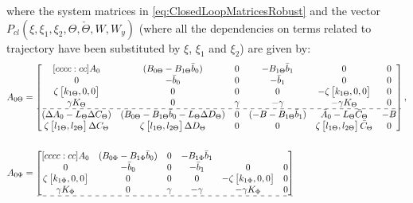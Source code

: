 \documentclass[../main.tex]{subfiles}
\begin{document}
where the system matrices in \eqref{eq:ClosedLoopMatricesRobust} and the vector $P_{cl}(\xi,\xi_1,\xi_2, \Theta,\check{\Theta},W,W_y)$ (where all the dependencies on terms related to trajectory have been substituted by $\xi$, $\xi_1$ and $\xi_2$) are given by:
\begingroup
\renewcommand*{\arraystretch}{1.5}
\begin{align*}
A_{0\Theta} &= 
\begin{bmatrix}[cccc:cc]
A_0 & (B_{0\Theta} - B_{1\Theta} \bar{b}_0) & 0 & -B_{1\Theta}\bar{b} _1 & 0 & 0\\
%
0 & -\bar{b}_0 & 0 & -\bar{b}_1 & 0 & 0\\
\zeta \begin{bmatrix}k_{1\Theta} , 0 , 0\end{bmatrix} & 0 & 0 & 0 & -\zeta\begin{bmatrix}k_{1\Theta} , 0 , 0\end{bmatrix} & 0\\
%
\gamma K_\Theta & 0 & \gamma & -\gamma & -\gamma K_\Theta & 0\\ \hdashline
%
(\Delta A_0 - L_\Theta \Delta C_\Theta) & (B_{0\Theta} - B_{1\Theta} \bar{b}_0 - L_\Theta \Delta D_\Theta) & 0 & (-B -B_{1\Theta}\bar{b}_1) & \bar{A}_0 - L_\Theta \bar{C}_\Theta & -B\\ 
%
\zeta \begin{bmatrix}l_{1\Theta} , l_{2\Theta}	\end{bmatrix} \Delta C_\Theta & \zeta \begin{bmatrix}l_{1\Theta} , l_{2\Theta}	\end{bmatrix} \Delta D_\Theta & 0 & 0 & \zeta \begin{bmatrix}l_{1\Theta} , l_{2\Theta}	\end{bmatrix} \bar{C}_\Theta & 0
\end{bmatrix},\\
\nonumber \\
%
%
%
A_{0\Phi} &= 
\begin{bmatrix}[cccc:cc]
A_0 &(B_{0\Phi} - B_{1\Phi} \bar{b}_0) & 0 & -B_{1\Phi}\bar{b} _1\\
%
0 & -\bar{b}_0 & 0 & -\bar{b}_1 & 0 & 0 \\
%
\zeta \begin{bmatrix}k_{1\Phi} , 0 , 0\end{bmatrix} & 0 & 0 & 0 & -\zeta\begin{bmatrix}k_{1\Phi} , 0 , 0\end{bmatrix} & 0 \\
%
\gamma K_{\Phi} & 0 & \gamma & -\gamma & -\gamma K_{\Phi} & 0\\ \hdashline

\end{bmatrix}
\end{align*}
\end{document}
